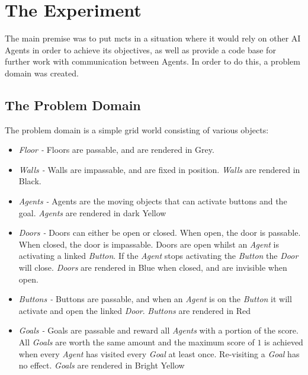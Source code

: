 \documentclass{IEEEtran}
\begin{document}
\section{The Experiment}
The main premise was to put \gls{mcts} in a situation where it would rely on other AI Agents in order to achieve its objectives, as well as provide a code base for further work with communication between Agents. In order to do this, a problem domain was created.
\subsection{The Problem Domain}
The problem domain is a simple grid world consisting of various objects:
\begin{itemize}
\item{\emph{Floor - } Floors are passable, and are rendered in Grey.}
\item{\emph{Walls -} Walls are impassable, and are fixed in position. \emph{Walls} are rendered in Black.}
\item{\emph{Agents -} Agents are the moving objects that can activate buttons and the goal. \emph{Agents} are rendered in dark Yellow}
\item{\emph{Doors -} Doors can either be open or closed. When open, the door is passable. When closed, the door is impassable. Doors are open whilst an \emph{Agent} is activating a linked \emph{Button}. If the \emph{Agent} stops activating the \emph{Button} the \emph{Door} will close. \emph{Doors} are rendered in Blue when closed, and are invisible when open.}
\item{\emph{Buttons -} Buttons are passable, and when an \emph{Agent} is on the \emph{Button} it will activate and open the linked \emph{Door}. \emph{Buttons} are rendered in Red}
\item{\emph{Goals -} Goals are passable and reward all \emph{Agents} with a portion of the score. All \emph{Goals} are worth the same amount and the maximum score of $1$ is achieved when every \emph{Agent} has visited every \emph{Goal} at least once. Re-visiting a \emph{Goal} has no effect. \emph{Goals} are rendered in Bright Yellow}
\end{itemize}
\end{document}
